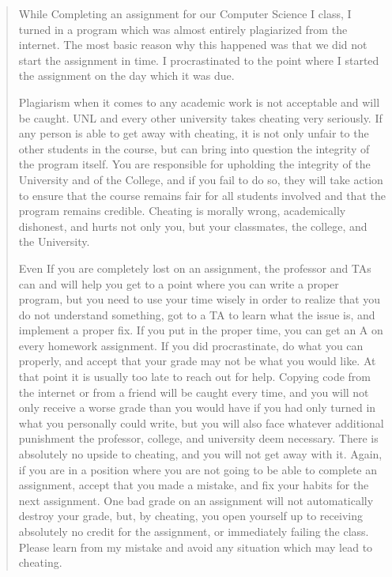 \documentclass[12pt]{scrartcl}
\begin{document}
\begin{quote}
While Completing an assignment for our Computer Science I class, I turned 
in a program which was almost entirely plagiarized from the internet.  
The most basic reason why this happened was that we did not start the 
assignment in time.  I procrastinated to the point where I started the 
assignment on the day which it was due.  

Plagiarism when it comes to any academic work is not acceptable and 
will be caught.  UNL and every other university takes 
cheating very seriously.  If any person is able to get away with 
cheating, it is not only unfair to the other students in the course, 
but can bring into question the integrity of the program itself.  
You are responsible for upholding the integrity of the University 
and of the College, and if you fail to do so, they will take action 
to ensure that the course remains fair for all students involved and 
that the program remains credible.  Cheating is morally wrong, 
academically dishonest, and hurts not only you, but your classmates, 
the college, and the University.

Even If you are completely lost on an assignment, the professor and TAs 
can and will help you get to a point where you can write a proper 
program, but you need to use your time wisely in order to realize 
that you do not understand something, got to a TA to learn what 
the issue is, and implement a proper fix.  If you put in the proper 
time, you can get an A on every homework assignment.  If you did 
procrastinate, do what you can properly, and accept that your grade 
may not be what you would like.  At that point it is usually too late 
to reach out for help.  Copying code from the internet or from a friend 
will be caught every time, and you will not only receive a worse grade 
than you would have if you had only turned in what you personally could 
write, but you will also face whatever additional punishment the 
professor, college, and university deem necessary.  There is absolutely 
no upside to cheating, and you will not get away with it.  Again, 
if you are in a position where you are not going to be able to complete 
an assignment, accept that you made a mistake, and fix your habits for 
the next assignment.  One bad grade on an assignment will not automatically 
destroy your grade, but, by cheating, you open yourself up to receiving 
absolutely no credit for the assignment, or immediately failing the 
class. Please learn from my mistake and avoid any situation which may 
lead to cheating.
\end{quote}
	
\end{document}
